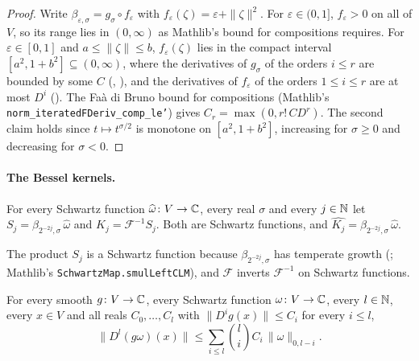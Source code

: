 \begin{proof}
\leanok
Write $\beta_{\varepsilon,\sigma} = g_\sigma \circ f_\varepsilon$ with $f_\varepsilon(\zeta) =
\varepsilon + \|\zeta\|^2$. For $\varepsilon \in (0, 1]$, $f_\varepsilon > 0$ on all of $V$, so
its range lies in $(0, \infty)$ as Mathlib's bound for compositions requires. For
$\varepsilon \in [0, 1]$ and $a \leq \|\zeta\| \leq b$, $f_\varepsilon(\zeta)$ lies in the compact
interval $[a^2, 1 + b^2] \subseteq (0, \infty)$, where the derivatives of $g_\sigma$ of the orders
$i \leq r$ are bounded by some $C$ (,
), and the derivatives of $f_\varepsilon$ of the orders
$1 \leq i \leq r$ are at most $D^i$ (). The Fa\`a di Bruno bound
for compositions (Mathlib's
\texttt{norm\_\allowbreak iteratedFDeriv\_\allowbreak comp\_\allowbreak le'}) gives
$C_r = \max(0, r! \, C D^r)$. The second claim holds since $t \mapsto t^{\sigma/2}$ is monotone on
$[a^2, 1 + b^2]$, increasing for $\sigma \geq 0$ and decreasing for $\sigma < 0$.
\end{proof}

\paragraph{The Bessel kernels.}

\begin{definition}
\label{def:bessel-kernel-family}
\leanok
{}
For every Schwartz function $\widehat\omega \colon V \to \mathbb{C}$, every real $\sigma$ and every
$j \in \mathbb{N}$ let $S_j = \beta_{2^{-2j},\sigma} \, \widehat\omega$ and
$K_j = \mathcal F^{-1} S_j$. Both are Schwartz functions, and
$\widehat{K_j} = \beta_{2^{-2j},\sigma} \, \widehat\omega$.
\end{definition}

The product $S_j$ is a Schwartz function because $\beta_{2^{-2j},\sigma}$ has temperate growth
(; Mathlib's
\texttt{SchwartzMap.\allowbreak smulLeftCLM}), and $\mathcal F$ inverts $\mathcal F^{-1}$ on
Schwartz functions.

\begin{lemma}
\label{lem:leibniz-schwartz}
\leanok
For every smooth $g \colon V \to \mathbb{C}$, every Schwartz function $\omega \colon V \to \mathbb{C}$, every
$l \in \mathbb{N}$, every $x \in V$ and all reals $C_0, \dots, C_l$ with $\|D^i g(x)\| \leq C_i$ for
every $i \leq l$,
\[
  \|D^l (g \omega)(x)\| \leq \sum_{i \leq l} \binom{l}{i} C_i \, \|\omega\|_{0,l-i} .
\]
\end{lemma}

